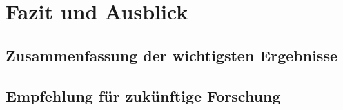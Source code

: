 \chapter{Fazit und Ausblick}

\section{Zusammenfassung der wichtigsten Ergebnisse}

\section{Empfehlung für zukünftige Forschung}
